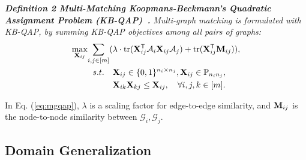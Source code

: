 \noindent \textit{\textbf{Definition 2 Multi-Matching Koopmans-Beckmann's Quadratic Assignment Problem (KB-QAP)~\cite{koopmans1957assignment}.} Multi-graph matching is formulated with KB-QAP, by summing KB-QAP objectives among all pairs of graphs:
\begin{align}
\label{eq:mgqap}
    \underset {\bold{X}_{ij}} {\max} \underset {i,j\in [m]}\sum ( & \lambda \cdot \text{tr}(\bold{X}_{ij}^{\mathsf{T}}\mathcal{A}_i\bold{X}_{ij}\mathcal{A}_j) + \text{tr}(\bold{X}_{ij}^{\mathsf{T}} \bold{M}_{ij})), \\ \nonumber
    s.t.  \quad & \bold{X}_{ij}\in \{ 0,1\}^{n_i\times n_j}, \bold{X}_{ij} \in \mathbb{P}_{n_i n_j},  \\ \nonumber
    & \bold{X}_{ik} \bold{X}_{kj} \leq \bold{X}_{ij}, \quad \forall i,j,k\in [m].
\end{align} }

\noindent In Eq. (\ref{eq:mgqap}), $\lambda$ is a scaling factor for edge-to-edge similarity, and $\bold{M}_{ij}$ is the node-to-node similarity between $\mathcal{G}_i, \mathcal{G}_j$.

\subsection{Domain Generalization}

